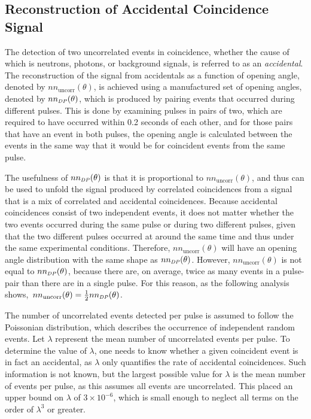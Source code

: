 \subsection{Reconstruction of Accidental Coincidence Signal}
\label{Reconstruction of Accidental Coincidence}
The detection of two uncorrelated events in coincidence, whether the cause of which is neutrons, photons, or background signals, is referred to as an \emph{accidental}.
The reconstruction of the signal from accidentals as a function of opening angle, denoted by $nn_{\text{uncorr}}(\theta)$, is achieved using a manufactured set of opening angles, denoted by $nn_{\scaleto{DP}{4pt}}(\theta)$, which is produced by pairing events that occurred during different pulses.
This is done by examining pulses in pairs of two, which are required to have occurred within 0.2 seconds of each other, and for those pairs that have an event in both pulses, the opening angle is calculated between the events in the same way that it would be for coincident events from the same pulse.

The usefulness of $nn_{\scaleto{DP}{4pt}}(\theta)$ is that it is proportional to $nn_{\text{uncorr}}(\theta)$, and thus can be used to unfold the signal produced by correlated coincidences from a signal that is a mix of correlated and accidental coincidences.
Because accidental coincidences consist of two independent events, it does not matter whether the two events occurred during the same pulse or during two different pulses, given that the two different pulses occurred at around the same time and thus under the same experimental conditions.
Therefore, $nn_{\text{uncorr}}(\theta)$ will have an opening angle distribution with the same shape as  $nn_{\scaleto{DP}{4pt}}(\theta)$.
However, $nn_{\text{uncorr}}(\theta)$ is not equal to $nn_{\scaleto{DP}{4pt}}(\theta)$, because there are, on average, twice as many events in a pulse-pair than there are in a single pulse.
For this reason, as the following analysis shows,~$nn_{\text{uncorr}}(\theta) = \frac{1}{2}nn_{\scaleto{DP}{4pt}}(\theta)$.

The number of uncorrelated events detected per pulse is assumed to follow the Poissonian distribution, which describes the occurrence of independent random events.
Let $\lambda$ represent the mean number of uncorrelated events per pulse. 
To determine the value of $\lambda$, one needs to know whether a given coincident event is in fact an accidental, as $\lambda$ only quantifies the rate of accidental coincidences.
Such information is not known, but the largest possible value for $\lambda$ is the mean number of events per pulse, as this assumes all events are uncorrelated.
This placed an upper bound on $\lambda$ of $3\times 10^{-6}$, which is small enough to neglect all terms on the order of $\lambda^3$ or greater.

